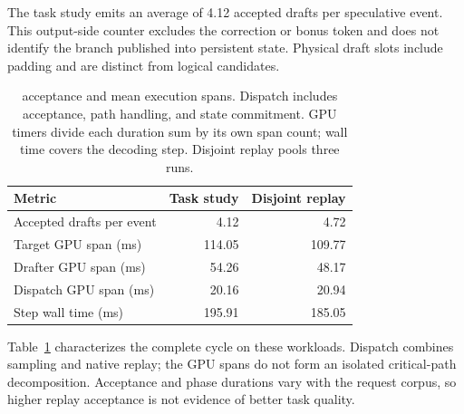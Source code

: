 The task study emits an average of 4.12 accepted drafts per \sys{} speculative event. This output-side counter excludes the correction or bonus token and does not identify the branch published into persistent state. Physical draft slots include padding and are distinct from logical candidates.

\begin{table}[t]
\caption{\sys{} acceptance and mean execution spans. Dispatch includes acceptance, path handling, and state commitment. GPU timers divide each duration sum by its own span count; wall time covers the decoding step. Disjoint replay pools three runs.}
\label{tab:recovered-telemetry}
\centering\small
\begin{tabular}{@{}lrr@{}}
\toprule
Metric & Task study & Disjoint replay \\
\midrule
Accepted drafts per event & 4.12 & 4.72 \\
Target GPU span (ms) & 114.05 & 109.77 \\
Drafter GPU span (ms) & 54.26 & 48.17 \\
Dispatch GPU span (ms) & 20.16 & 20.94 \\
Step wall time (ms) & 195.91 & 185.05 \\
\bottomrule
\end{tabular}
\end{table}

Table~\ref{tab:recovered-telemetry} characterizes the complete \sys{} cycle on these workloads. Dispatch combines sampling and native replay; the GPU spans do not form an isolated critical-path decomposition. Acceptance and phase durations vary with the request corpus, so higher replay acceptance is not evidence of better task quality.
